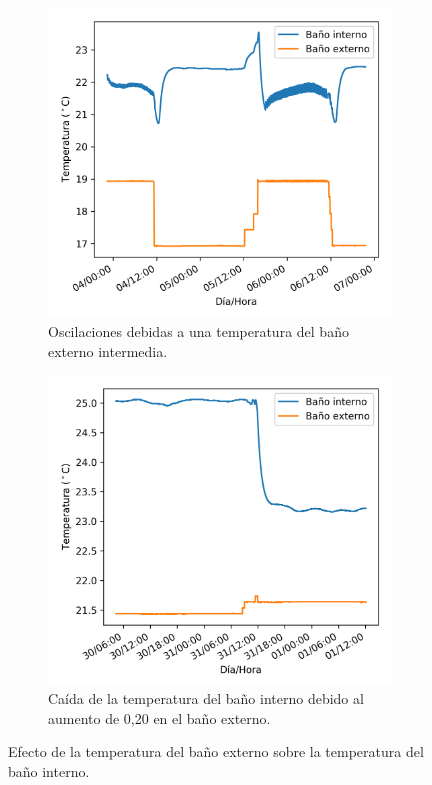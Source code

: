 	\begin{figure}[h]
		\centering
		\begin{subfigure}{0.49\linewidth}
			\includegraphics[width=\linewidth]{../Data/TemperatureStability/temperatureRipple}
			\caption{Oscilaciones debidas a una temperatura del baño externo intermedia.}
			\label{fig: temperatureRipple}
		\end{subfigure}
		\begin{subfigure}{0.49\linewidth}
			\includegraphics[width=\linewidth]{../Data/TemperatureStability/temperatureSensibility}
			\caption{Caída de la temperatura del baño interno debido al aumento de 0,20 \grad{} en el baño externo.}
			\label{fig: temperatureSensibility}
		\end{subfigure}
		\caption{Efecto de la temperatura del baño externo sobre la temperatura del baño interno.}
		\label{fig: externalEffects}
	\end{figure}

